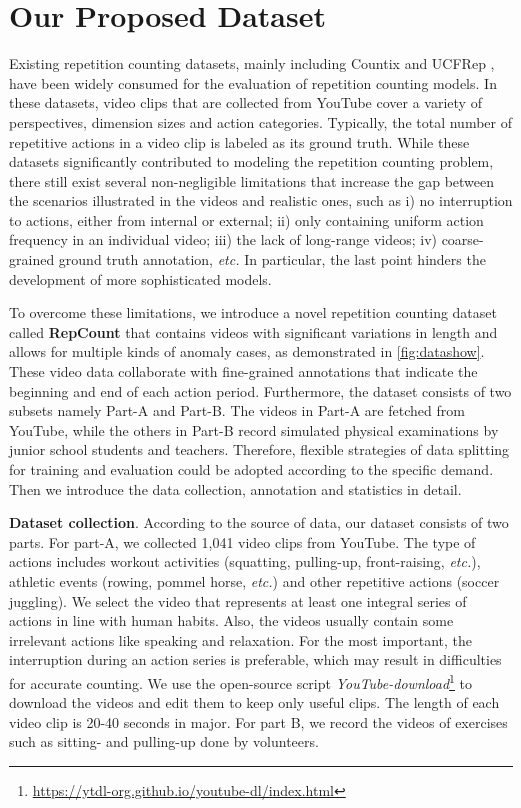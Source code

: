 \documentclass[10pt,twocolumn,letterpaper]{article}
\begin{document}
\section{Our Proposed Dataset}
Existing repetition counting datasets, mainly including Countix \cite{RepNet} and UCFRep \cite{Zhang_2020_CVPR}, have been widely  consumed for the evaluation of repetition counting models. In these datasets, video clips that are collected from YouTube cover a variety of perspectives, dimension sizes and action categories. Typically, the total number of repetitive actions in a video clip is labeled as its ground truth. While these datasets significantly contributed to modeling the repetition counting problem, there still exist several non-negligible limitations that increase the gap between the scenarios illustrated in the videos and realistic ones, such as i) no interruption to actions, either from internal or external; ii) only containing uniform action frequency in an individual video; iii) the lack of long-range videos; iv) coarse-grained ground truth annotation, \emph{etc.} In particular, the last point hinders the development of more sophisticated models.

To overcome these limitations, we introduce a novel repetition counting dataset called \textbf{RepCount} that contains videos with significant variations in length and allows for multiple kinds of anomaly cases, as demonstrated in \cref{fig:datashow}. These video data collaborate with fine-grained annotations that indicate the beginning and end of each action period. Furthermore, the dataset consists of two subsets namely Part-A and Part-B. The videos in Part-A are fetched from YouTube, while the others in Part-B record simulated physical examinations by junior school students and teachers. Therefore, flexible strategies of data splitting for training and evaluation could be adopted according to the specific demand. Then we introduce the data collection, annotation and statistics in detail.  

\noindent \textbf{Dataset collection}. According to the source of data, our dataset consists of two parts. For part-A, we collected 1,041 video clips from YouTube. The type of actions includes workout activities (squatting, pulling-up, front-raising, \emph{etc.}), athletic events (rowing, pommel horse, \emph{etc.}) and other repetitive actions (soccer juggling). We select the video that represents at least one integral series of actions in line with human habits. Also, the videos usually contain some irrelevant actions like speaking and relaxation. For the most important, the interruption during an action series is preferable, which may result in difficulties for accurate counting. We use the open-source script \textit{YouTube-download}\footnote{\url{ https://ytdl-org.github.io/youtube-dl/index.html}} to download the videos and edit them to keep only useful clips. The length of each video clip is 20-40 seconds in major. For part B, we record the videos of exercises such as sitting- and pulling-up done by volunteers. 
\end{document}
